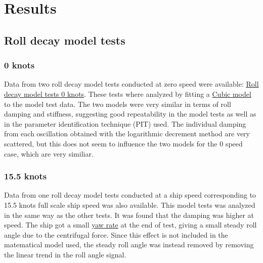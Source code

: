 \section{Results}\label{results}

    \subsection{Roll decay model tests}\label{roll-decay-model-tests}

\subsubsection{0 knots}\label{knots}

Data from two roll decay model tests conducted at zero speed were
available:
\href{../../notebooks/01.2_select_suitable_MDL_test_KLVCC2.ipynb\#rolldecay}{Roll
decay model tests 0 knots}. These tests where analyzed by fitting a
\href{../../notebooks/01.2_select_suitable_MDL_test_KLVCC2.ipynb\#cubic_model}{Cubic
model} to the model test data. The two models were very similar in terms
of roll damping and stiffness, suggesting good repeatability in the
model tests as well as in the parameter identification technique (PIT)
used. The individual damping from each oscillation obtained with the
logarithmic decrement method are very scattered, but this does not seem
to influence the two models for the 0 speed case, which are very
similiar.

    \subsubsection{15.5 knots}\label{knots}

Data from one roll decay model tests conducted at a ship speed
corresponding to 15.5 knots full scale ship speed was also available.
This model tests was analyzed in the same way as the other tests. It was
found that the damping was higher at speed. The ship got a small
\href{../../notebooks/01.3_select_suitable_MDL_test_KLVCC2_speed.ipynb\#yawrate}{yaw
rate} at the end of test, giving a small steady roll angle due to the
centrifugal force. Since this effect is not included in the matematical
model used, the steady roll angle was instead removed by removing the
linear trend in the roll angle signal.

    \begin{center}
    \end{center}
    { \hspace*{\fill} \\}
    
